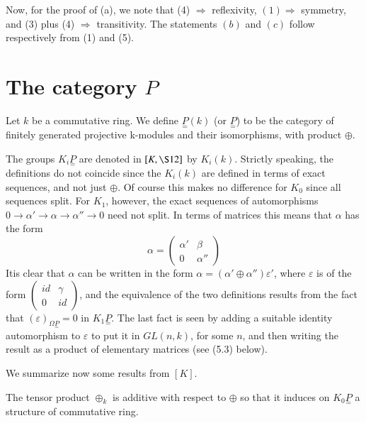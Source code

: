 Now, for the proof of (a), we note that (4) $\Rightarrow$ reflexivity,
$(1) \Rightarrow$ symmetry, and (3) plus (4) $\Rightarrow$
transitivity. The statements $(b)$ and $(c)$ follow respectively from
(1) and (5). 


\section{The category \underline{\underline{$P$}}}\label{chap1:sec5}%

Let $k$ be a commutative ring. We define $\underset{=}{P}(k)$ (or
$\underset{=}{P}$) to be the category of finitely generated projective
k-modules and their isomorphisms, with product $\oplus$. 

The groups $K_i \underset{=}{P}$ are denoted in $[ K, \S 12 ]$ by
$K_i(k)$. Strictly speaking, the definitions do not coincide since the
$K_i(k)$ are defined in terms of exact sequences, and not just
$\oplus$. Of course this makes no difference for $K_0$ since all
sequences split. For $K_1$, however, the exact sequences of
automorphisms $0 \to \alpha' \to \alpha \to \alpha'' \to 0$ need not
split. In terms of matrices this means that $\alpha$ has the form  
$$
\alpha =
\begin{pmatrix}
\alpha' & \beta \\
0 & \alpha''
\end{pmatrix}
$$
It\pageoriginale is clear that $\alpha$ can be written in the form $\alpha =
(\alpha' \oplus \alpha'') \varepsilon'$, where $\varepsilon$ is of the
form $\left(\begin{smallmatrix}id & \gamma \\0 &
  id \end{smallmatrix}\right)$, and the equivalence of the two
definitions results from the fact that $(\varepsilon)_{\Omega
  \underset{=}{P}} = 0$ in $K_1 \underset{=}{P}$. The last fact is seen
by adding a suitable identity automorphism to $\varepsilon$ to put it
in $GL(n, k)$, for some $n$, and then writing the result as a product
of elementary matrices (see (5.3) below). 

We summarize now some results from $[K]$.

The tensor product $\oplus_k$ is additive with respect to $\oplus$ so
that it induces on $K_0 \underset{=}{P}$ a structure of commutative
ring. 


